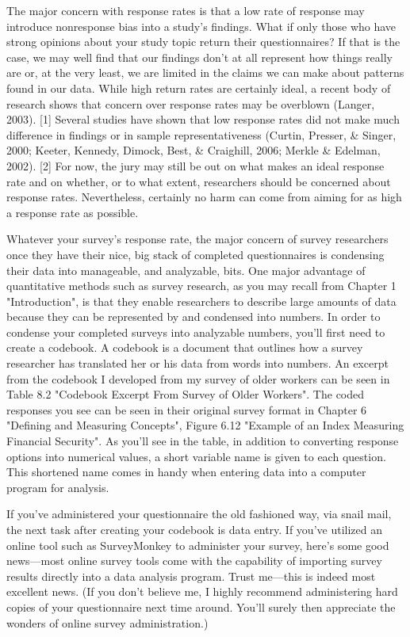 The major concern with response rates is that a low rate of response may introduce nonresponse bias into a study’s findings. What if only those who have strong opinions about your study topic return their questionnaires? If that is the case, we may well find that our findings don’t at all represent how things really are or, at the very least, we are limited in the claims we can make about patterns found in our data. While high return rates are certainly ideal, a recent body of research shows that concern over response rates may be overblown (Langer, 2003). [1] Several studies have shown that low response rates did not make much difference in findings or in sample representativeness (Curtin, Presser, \& Singer, 2000; Keeter, Kennedy, Dimock, Best, \& Craighill, 2006; Merkle \& Edelman, 2002). [2] For now, the jury may still be out on what makes an ideal response rate and on whether, or to what extent, researchers should be concerned about response rates. Nevertheless, certainly no harm can come from aiming for as high a response rate as possible.

Whatever your survey’s response rate, the major concern of survey researchers once they have their nice, big stack of completed questionnaires is condensing their data into manageable, and analyzable, bits. One major advantage of quantitative methods such as survey research, as you may recall from Chapter 1 "Introduction", is that they enable researchers to describe large amounts of data because they can be represented by and condensed into numbers. In order to condense your completed surveys into analyzable numbers, you’ll first need to create a codebook. A codebook is a document that outlines how a survey researcher has translated her or his data from words into numbers. An excerpt from the codebook I developed from my survey of older workers can be seen in Table 8.2 "Codebook Excerpt From Survey of Older Workers". The coded responses you see can be seen in their original survey format in Chapter 6 "Defining and Measuring Concepts", Figure 6.12 "Example of an Index Measuring Financial Security". As you’ll see in the table, in addition to converting response options into numerical values, a short variable name is given to each question. This shortened name comes in handy when entering data into a computer program for analysis.

If you’ve administered your questionnaire the old fashioned way, via snail mail, the next task after creating your codebook is data entry. If you’ve utilized an online tool such as SurveyMonkey to administer your survey, here’s some good news—most online survey tools come with the capability of importing survey results directly into a data analysis program. Trust me—this is indeed most excellent news. (If you don’t believe me, I highly recommend administering hard copies of your questionnaire next time around. You’ll surely then appreciate the wonders of online survey administration.)

